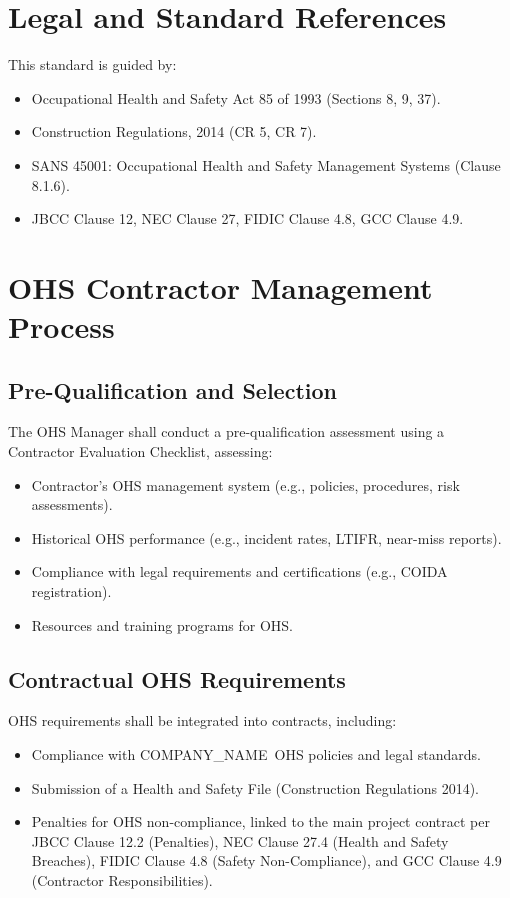 \documentclass[11pt]{article}
\newcommand{\clientName}{{{COMPANY_NAME}}}
\begin{document}
\section{Legal and Standard References}
This standard is guided by:
\begin{itemize}
    \item Occupational Health and Safety Act 85 of 1993 (Sections 8, 9, 37).
    \item Construction Regulations, 2014 (CR 5, CR 7).
    \item SANS 45001: Occupational Health and Safety Management Systems (Clause 8.1.6).
    \item JBCC Clause 12, NEC Clause 27, FIDIC Clause 4.8, GCC Clause 4.9.
\end{itemize}

\section{OHS Contractor Management Process}

\subsection{Pre-Qualification and Selection}
The OHS Manager shall conduct a pre-qualification assessment using a Contractor Evaluation Checklist, assessing:
\begin{itemize}
    \item Contractor’s OHS management system (e.g., policies, procedures, risk assessments).
    \item Historical OHS performance (e.g., incident rates, LTIFR, near-miss reports).
    \item Compliance with legal requirements and certifications (e.g., COIDA registration).
    \item Resources and training programs for OHS.
\end{itemize}

\subsection{Contractual OHS Requirements}
OHS requirements shall be integrated into contracts, including:
\begin{itemize}
    \item Compliance with \clientName\ OHS policies and legal standards.
    \item Submission of a Health and Safety File (Construction Regulations 2014).
    \item Penalties for OHS non-compliance, linked to the main project contract per JBCC Clause 12.2 (Penalties), NEC Clause 27.4 (Health and Safety Breaches), FIDIC Clause 4.8 (Safety Non-Compliance), and GCC Clause 4.9 (Contractor Responsibilities).
\end{itemize}
\end{document}
